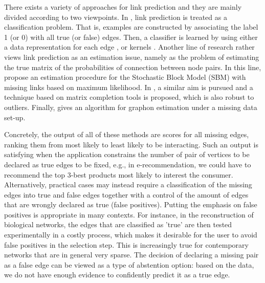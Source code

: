 \documentclass[a4paper, 11pt]{article}
\theoremstyle{remark}
\begin{document}
 
There exists a variety of approaches for link prediction and they are mainly divided according to two viewpoints. In \cite{benhur05, bleakley07, li13, zhang2018link}, link prediction is treated as a classification problem.  That is, examples are constructed by associating the label 1 (or 0) with all true (or false) edges. Then, a classifier is learned by using either a data representation for each edge \citep{zhang2018link}, or kernels \citep{benhur05, bleakley07, li13}. %
Another line of research rather views link prediction as an estimation issue, namely as the problem of estimating the true matrix of the probabilities of connection between node pairs. In this line, \cite{chiquet20} propose an estimation procedure for the Stochastic Block Model (SBM) with missing links based on maximum likelihood. In \cite{gaucher21}, a similar aim is pursued and a technique based on matrix completion tools is proposed, which is also robust to outliers. Finally, \cite{mukherjee19} gives an algorithm for graphon estimation under a missing data set-up. %


Concretely, the output of all of these methods are scores for all missing edges, ranking them from most likely to least likely to be interacting. 
Such an output is satisfying when the application constrains the number of pair of vertices to be declared as true edges to be fixed, e.g., in e-recommendation, we could have to recommend the top 3-best products most likely to interest the consumer. Alternatively, practical cases may instead require a classification of the missing edges into true and false edges together with a control of the amount of edges that are wrongly declared as true (false positives). Putting the emphasis on false positives is appropriate in many contexts.
For instance, in the reconstruction of biological networks, the edges that are classified as 'true' are then tested experimentally in a costly process, which makes it desirable for the user to avoid false positives in the selection step. 
This is increasingly true for contemporary networks that are in general very sparse. The decision of declaring a missing pair as a false edge can be viewed as a type of abstention option: based on the data, we do not have enough evidence to confidently predict it as a true edge.
\end{document}
